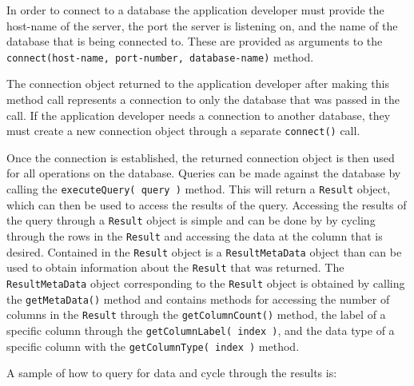 \documentclass[letterpaper, 12pt]{article}
\begin{document}
  In order to connect to a database the application developer must provide the 
  host-name of the server, the port the server is listening on, and the name of the
  database that is being connected to. These are provided as arguments to the 
  \lstinline[basicstyle=\ttfamily]|connect(host-name, port-number, database-name)|
  method. 
  \par\vspace{\baselineskip}  
  The connection object returned to the application developer after making this method
  call represents a connection to only the database that was passed in the call. If the 
  application developer needs a connection to another database, they must create a new
  connection object through a separate
  \lstinline[basicstyle=\ttfamily]|connect()| call. 
  \par\vspace{\baselineskip}
  Once the connection is established, the returned connection object is then used for all
  operations on the database. Queries can be made against the database by calling 
  the \lstinline[basicstyle=\ttfamily]|executeQuery( query )|
  method. This will return a \lstinline[basicstyle=\ttfamily]|Result| object, which can 
  then be used to access the results of the query. Accessing the results of the query
  through a \lstinline[basicstyle=\ttfamily]|Result| object is simple and can be done by 
  by cycling through the rows in the
  \lstinline[basicstyle=\ttfamily]|Result| and accessing the data at the column that 
  is desired. Contained in the \lstinline[basicstyle=\ttfamily]|Result| object is a 
  \lstinline[basicstyle=\ttfamily]|ResultMetaData| object than can be used to obtain 
  information about the \lstinline[basicstyle=\ttfamily]|Result| that was returned.
  The \lstinline[basicstyle=\ttfamily]|ResultMetaData| object corresponding to the 
  \lstinline[basicstyle=\ttfamily]|Result| object is obtained by calling the 
  \lstinline[basicstyle=\ttfamily]|getMetaData()| method and contains
  methods for accessing the number of columns in the 
  \lstinline[basicstyle=\ttfamily]|Result| through the 
  \lstinline[basicstyle=\ttfamily]|getColumnCount()| method, the
  label of a specific column through the
  \lstinline[basicstyle=\ttfamily]|getColumnLabel( index )|, 
  and the data type of a specific column with the
  \lstinline[basicstyle=\ttfamily]|getColumnType( index )| method.
  \par\vspace{\baselineskip}
  A sample of how to query for data and cycle through the results is: 
  
\end{document}

